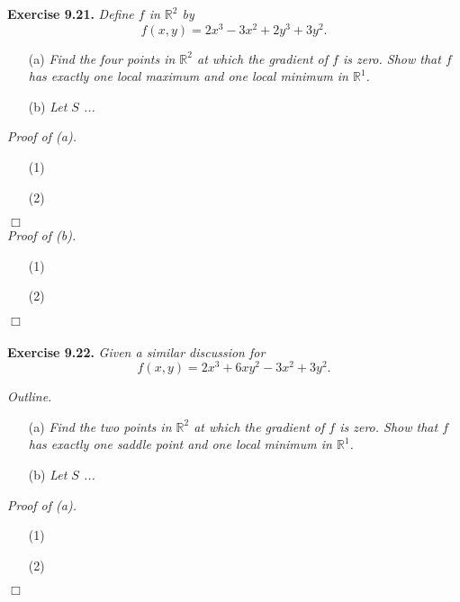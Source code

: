\documentclass{article}
\begin{document}
\textbf{Exercise 9.21.}
\emph{Define $f$ in $\mathbb{R}^2$ by}
\[
  f(x,y) = 2x^3-3x^2+2y^3+3y^2.
\]
\begin{enumerate}
\item[(a)]
  \emph{Find the four points in $\mathbb{R}^2$ at which the gradient of $f$ is zero.
  Show that $f$ has exactly one local maximum and one local minimum in $\mathbb{R}^1$.}

\item[(b)]
  \emph{Let $S$ ...} \\
\end{enumerate}



\emph{Proof of (a).}
\begin{enumerate}
\item[(1)]
\item[(2)]
\end{enumerate}
$\Box$ \\



\emph{Proof of (b).}
\begin{enumerate}
\item[(1)]
\item[(2)]
\end{enumerate}
$\Box$ \\\\






\textbf{Exercise 9.22.}
\emph{Given a similar discussion for}
\[
  f(x,y) = 2x^3+6xy^2-3x^2+3y^2.
\]



\emph{Outline.}
\begin{enumerate}
\item[(a)]
  \emph{Find the two points in $\mathbb{R}^2$ at which the gradient of $f$ is zero.
  Show that $f$ has exactly one saddle point and one local minimum in $\mathbb{R}^1$.}

\item[(b)]
  \emph{Let $S$ ...} \\
\end{enumerate}



\emph{Proof of (a).}
\begin{enumerate}
\item[(1)]
\item[(2)]
\end{enumerate}
$\Box$ \\
\end{document}
